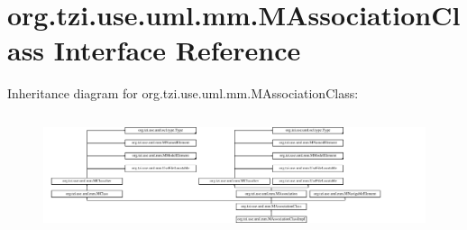 \hypertarget{interfaceorg_1_1tzi_1_1use_1_1uml_1_1mm_1_1_m_association_class}{\section{org.\-tzi.\-use.\-uml.\-mm.\-M\-Association\-Class Interface Reference}
\label{interfaceorg_1_1tzi_1_1use_1_1uml_1_1mm_1_1_m_association_class}
}
Inheritance diagram for org.\-tzi.\-use.\-uml.\-mm.\-M\-Association\-Class\-:\begin{figure}[H]
\begin{center}
\leavevmode
\includegraphics[height=3.486381cm]{interfaceorg_1_1tzi_1_1use_1_1uml_1_1mm_1_1_m_association_class}
\end{center}
\end{figure}

